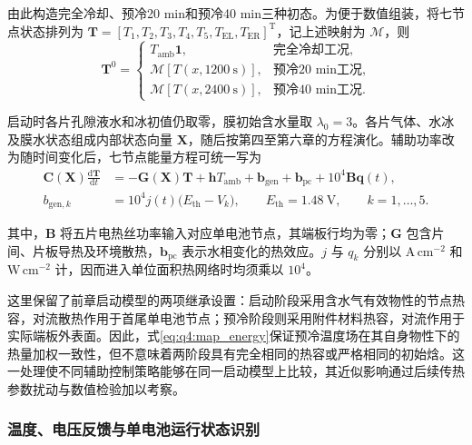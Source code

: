 \documentclass[bwprint]{gmcmthesis}
\numberwithin{figure}{section}
\begin{document}
由此构造完全冷却、预冷20 min和预冷40 min三种初态。为便于数值组装，将七节点状态排列为 $\boldsymbol T=[T_1,T_2,T_3,T_4,T_5,T_{\mathrm{EL}},T_{\mathrm{ER}}]^{\mathrm T}$，记上述映射为 $\mathcal M$，则
\begin{equation}
\boldsymbol T^0=\begin{cases}
T_{\mathrm{amb}}\boldsymbol 1, & \text{完全冷却工况},\\
\mathcal M[T(x,1200\ \mathrm s)], & \text{预冷20 min工况},\\
\mathcal M[T(x,2400\ \mathrm s)], & \text{预冷40 min工况}.
\end{cases}
\tag{7-9}\label{eq:q4:three_initial_states}
\end{equation}

启动时各片孔隙液水和冰初值仍取零，膜初始含水量取 $\lambda_0=3$。各片气体、水冰及膜水状态组成内部状态向量 $\boldsymbol X$，随后按第四至第六章的方程演化。辅助功率改为随时间变化后，七节点能量方程可统一写为
\begin{equation}
\begin{aligned}
\boldsymbol C(\boldsymbol X)\frac{\mathrm d\boldsymbol T}{\mathrm dt}
&=-\boldsymbol G(\boldsymbol X)\boldsymbol T
+\boldsymbol hT_{\mathrm{amb}}+\boldsymbol b_{\mathrm{gen}}
+\boldsymbol b_{\mathrm{pc}}+10^4\boldsymbol B\boldsymbol q(t),\\
b_{\mathrm{gen},k}&=10^4j(t)\big(E_{\mathrm{th}}-V_k\big),\qquad
E_{\mathrm{th}}=1.48\ \mathrm V,\qquad k=1,\ldots,5.
\end{aligned}
\tag{7-10}\label{eq:q4:plant_heat}
\end{equation}

其中，$\boldsymbol B$ 将五片电热丝功率输入对应单电池节点，其端板行均为零；$\boldsymbol G$ 包含片间、片板导热及环境散热，$\boldsymbol b_{\mathrm{pc}}$ 表示水相变化的热效应。$j$ 与 $q_k$ 分别以 $\mathrm{A\,cm^{-2}}$ 和 $\mathrm{W\,cm^{-2}}$ 计，因而进入单位面积热网络时均须乘以 $10^4$。

这里保留了前章启动模型的两项继承设置：启动阶段采用含水气有效物性的节点热容，对流散热作用于首尾单电池节点；预冷阶段则采用附件材料热容，对流作用于实际端板外表面。因此，式\eqref{eq:q4:map_energy}保证预冷温度场在其自身物性下的热量加权一致性，但不意味着两阶段具有完全相同的热容或严格相同的初始焓。这一处理使不同辅助控制策略能够在同一启动模型上比较，其近似影响通过后续传热参数扰动与数值检验加以考察。

\subsubsection{温度、电压反馈与单电池运行状态识别}
\end{document}
